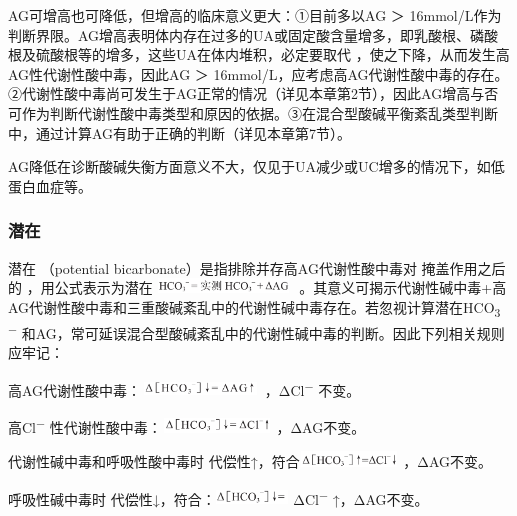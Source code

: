 AG可增高也可降低，但增高的临床意义更大：①目前多以AG ＞
16mmol/L作为判断界限。AG增高表明体内存在过多的UA或固定酸含量增多，即乳酸根、磷酸根及硫酸根等的增多，这些UA在体内堆积，必定要取代{}
，使之下降，从而发生高AG性代谢性酸中毒，因此AG ＞
16mmol/L，应考虑高AG代谢性酸中毒的存在。②代谢性酸中毒尚可发生于AG正常的情况（详见本章第2节），因此AG增高与否可作为判断代谢性酸中毒类型和原因的依据。③在混合型酸碱平衡紊乱类型判断中，通过计算AG有助于正确的判断（详见本章第7节）。

AG降低在诊断酸碱失衡方面意义不大，仅见于UA减少或UC增多的情况下，如低蛋白血症等。

\subsubsection{潜在{}}

潜在{} （potential bicarbonate）是指排除并存高AG代谢性酸中毒对{}
掩盖作用之后的{}
，用公式表示为潜在\includegraphics[width=1.47917in,height=0.15625in]{./images/Image00262.jpg}
。其意义可揭示代谢性碱中毒+高AG代谢性酸中毒和三重酸碱紊乱中的代谢性碱中毒存在。若忽视计算潜在HCO\textsubscript{3}
\textsuperscript{−}
和AG，常可延误混合型酸碱紊乱中的代谢性碱中毒的判断。因此下列相关规则应牢记：

高AG代谢性酸中毒：\includegraphics[width=1.23958in,height=0.13542in]{./images/Image00263.jpg}
，ΔCl\textsuperscript{−} 不变。

高Cl\textsuperscript{−}
性代谢性酸中毒：\includegraphics[width=1.14583in,height=0.15625in]{./images/Image00264.jpg}
，ΔAG不变。

代谢性碱中毒和呼吸性酸中毒时{}
代偿性↑，符合\includegraphics[width=1.03125in,height=0.16667in]{./images/Image00266.jpg}
，ΔAG不变。

呼吸性碱中毒时{}
代偿性↓，符合：\includegraphics[width=0.76042in,height=0.14583in]{./images/Image00268.jpg}
ΔCl\textsuperscript{−} ↑，ΔAG不变。

\protect\hypertarget{text00203.html}{}{}

